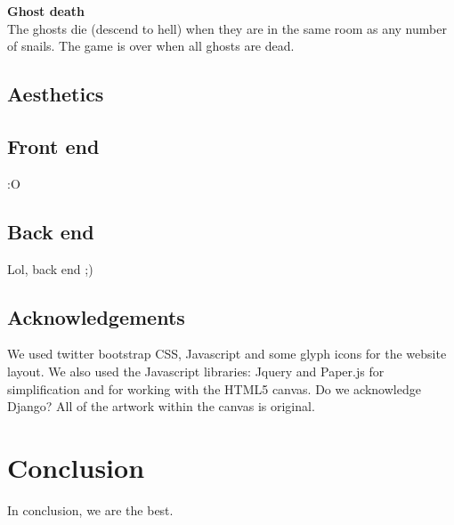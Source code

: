 \documentclass{article}
\begin{document}
\textbf{Ghost death} \\
The ghosts die (descend to hell) when they are in the same room as any number of snails. The game is over when all ghosts are dead.

\subsection{Aesthetics}
\subsection{Front end}
:O
\subsection{Back end}
Lol, back end ;)
\subsection{Acknowledgements}
We used twitter bootstrap CSS, Javascript and some glyph icons for the website layout. We also used the Javascript libraries: Jquery and Paper.js for simplification and for working with the HTML5 canvas. Do we acknowledge Django? All of the artwork within the canvas is original.

\section{Conclusion}
In conclusion, we are the best.
\end{document}
